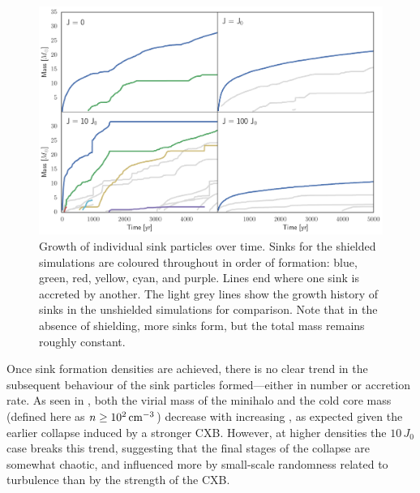 \documentclass[../thesis.tex]{subfiles}
\begin{document}
\begin{figure}
  \begin{center}
    \includegraphics[width=\columnwidth]{figures/sinks/sink_masses}
    \caption{Growth of individual sink particles over time. Sinks for the shielded simulations are coloured throughout in order of formation: blue, green, red, yellow,  cyan, and purple. Lines end where one sink is accreted by another.  The light grey lines show the growth history of sinks in the unshielded simulations for comparison. Note that in the absence of shielding, more sinks form, but the total mass remains roughly constant.}
    \label{sinkmasses}
  \end{center}
\end{figure}

 Once sink formation densities are achieved, there is no clear trend in the subsequent behaviour of the sink particles formed---either in number or accretion rate.  As seen in , both the virial mass of the minihalo and the cold core mass (defined here as $n\geq10^2\,\mathrm{cm}^{-3}$) decrease with increasing \jxr, as expected given the earlier collapse induced by a stronger CXB.  However, at higher densities the $10\,J_0$ case breaks this trend, suggesting that the final stages of the collapse are somewhat chaotic, and influenced more by small-scale randomness related to turbulence than by the strength of the CXB.
\end{document}
